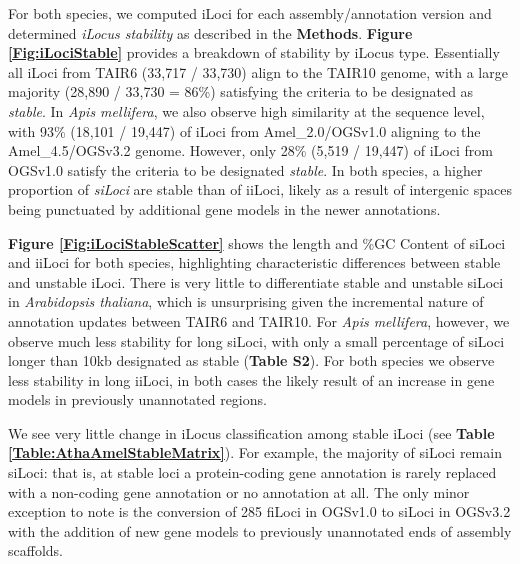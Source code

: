 For both species, we computed iLoci for each assembly/annotation version and determined \textit{iLocus stability} as described in the \textbf{Methods}.
\textbf{Figure \ref{Fig:iLociStable}} provides a breakdown of stability by iLocus type.
Essentially all iLoci from TAIR6 (33,717 / 33,730) align to the TAIR10 genome, with a large majority (28,890 / 33,730 = 86\%) satisfying the criteria to be designated as \textit{stable}.
In \textit{Apis mellifera}, we also observe high similarity at the sequence level, with 93\% (18,101 / 19,447) of iLoci from Amel\_2.0/OGSv1.0 aligning to the Amel\_4.5/OGSv3.2 genome.
However, only 28\% (5,519 / 19,447) of iLoci from OGSv1.0 satisfy the criteria to be designated \textit{stable}.
In both species, a higher proportion of \textit{siLoci} are stable than of iiLoci, likely as a result of intergenic spaces being punctuated by additional gene models in the newer annotations.

\textbf{Figure \ref{Fig:iLociStableScatter}} shows the length and \%GC Content of siLoci and iiLoci for both species, highlighting characteristic differences between stable and unstable iLoci.
There is very little to differentiate stable and unstable siLoci in \textit{Arabidopsis thaliana}, which is unsurprising given the incremental nature of annotation updates between TAIR6 and TAIR10.
For \textit{Apis mellifera}, however, we observe much less stability for long siLoci, with only a small percentage of siLoci longer than 10kb designated as stable (\textbf{Table S2}).
For both species we observe less stability in long iiLoci, in both cases the likely result of an increase in gene models in previously unannotated regions.

We see very little change in iLocus classification among stable iLoci (see \textbf{Table \ref{Table:AthaAmelStableMatrix}}).
For example, the majority of siLoci remain siLoci: that is, at stable loci a protein-coding gene annotation is rarely replaced with a non-coding gene annotation or no annotation at all.
The only minor exception to note is the conversion of 285 fiLoci in OGSv1.0 to siLoci in OGSv3.2 with the addition of new gene models to previously unannotated ends of assembly scaffolds.

